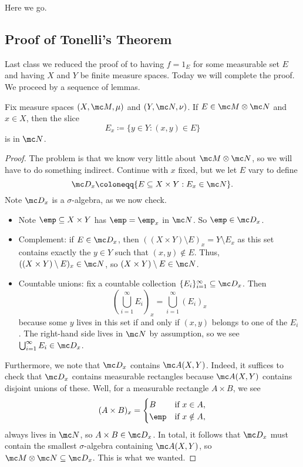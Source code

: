 \documentclass[../notes.tex]{subfiles}
\begin{document}
Here we go.

\subsection{Proof of Tonelli's Theorem}
Last class we reduced the proof of  to having $f=1_E$ for some measurable set $E$ and having $X$ and $Y$ be finite measure spaces. Today we will complete the proof. We proceed by a sequence of lemmas.
\begin{lemma}
	Fix measure spaces $(X,\mc M,\mu)$ and $(Y,\mc N,\nu)$. If $E\in\mc M\otimes\mc N$ and $x\in X$, then the slice
	\[E_x\coloneqq\{y\in Y:(x,y)\in E\}\]
	is in $\mc N$.
\end{lemma}
\begin{proof}
	The problem is that we know very little about $\mc M\otimes\mc N$, so we will have to do something indirect. Continue with $x$ fixed, but we let $E$ vary to define
	\[\mc D_x\coloneqq\{E\subseteq X\times Y:E_x\in\mc N\}.\]
	Note $\mc D_x$ is a $\sigma$-algebra, as we now check.
	\begin{itemize}
		\item Note $\emp\subseteq X\times Y$ has $\emp=\emp_x$ in $\mc N$. So $\emp\in\mc D_x$.
		\item Complement: if $E\in\mc D_x$, then $((X\times Y)\setminus E)_x=Y\setminus E_x$ as this set contains exactly the $y\in Y$ such that $(x,y)\notin E$. Thus, $((X\times Y)\setminus E)_x\in\mc N$, so $(X\times Y)\setminus E\in\mc N$.
		\item Countable unions: fix a countable collection $\{E_i\}_{i=1}^\infty\subseteq\mc D_x$. Then
		\[\left(\bigcup_{i=1}^\infty E_i\right)_x=\bigcup_{i=1}^\infty(E_i)_x\]
		because some $y$ lives in this set if and only if $(x,y)$ belongs to one of the $E_i$. The right-hand side lives in $\mc N$ by assumption, so we see $\bigcup_{i=1}^\infty E_i\in\mc D_x$.
	\end{itemize}
	Furthermore, we note that $\mc D_x$ contains $\mc A(X,Y)$. Indeed, it suffices to check that $\mc D_x$ contains measurable rectangles because $\mc A(X,Y)$ contains disjoint unions of these. Well, for a measurable rectangle $A\times B$, we see
	\begin{equation}
		(A\times B)_x=\begin{cases}
			B & \text{if }x\in A, \\
			\emp & \text{if }x\notin A,
		\end{cases} \label{eq:measure-slice-rectangle}
	\end{equation}
	always lives in $\mc N$, so $A\times B\in\mc D_x$. In total, it follows that $\mc D_x$ must contain the smallest $\sigma$-algebra containing $\mc A(X,Y)$, so $\mc M\otimes\mc N\subseteq\mc D_x$. This is what we wanted.
\end{proof}
\end{document}
